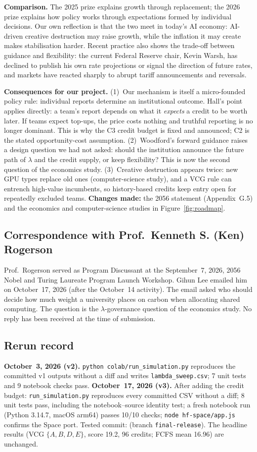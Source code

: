 \textbf{Comparison.} The 2025 prize explains growth through replacement; the 2026 prize explains how policy works through expectations formed by individual decisions. Our own reflection is that the two meet in today's AI economy: AI-driven creative destruction may raise growth, while the inflation it may create makes stabilisation harder. Recent practice also shows the trade-off between guidance and flexibility: the current Federal Reserve chair, Kevin Warsh, has declined to publish his own rate projections or signal the direction of future rates, and markets have reacted sharply to abrupt tariff announcements and reversals.

\textbf{Consequences for our project.} (1)~Our mechanism is itself a micro-founded policy rule: individual reports determine an institutional outcome. Hall's point applies directly: a team's report depends on what it \emph{expects} a credit to be worth later. If teams expect top-ups, the price costs nothing and truthful reporting is no longer dominant. This is why the C3 credit budget is fixed and announced; C2 is the stated opportunity-cost assumption. (2)~Woodford's forward guidance raises a design question we had not asked: should the institution announce the future path of $\lambda$ and the credit supply, or keep flexibility? This is now the second question of the economics study. (3)~Creative destruction appears twice: new GPU types replace old ones (computer-science study), and a VCG rule can entrench high-value incumbents, so history-based credits keep entry open for repeatedly excluded teams. \textbf{Changes made:} the 2056 statement (Appendix~G.5) and the economics and computer-science studies in Figure~\ref{fig:roadmap}.

\subsection{Correspondence with Prof.~Kenneth S. (Ken) Rogerson}
Prof.~Rogerson served as Program Discussant at the September~7, 2026, 2056 Nobel and Turing Laureate Program Launch Workshop. Gihun Lee emailed him on October~17, 2026 (after the October~14 activity). The email asked who should decide how much weight a university places on carbon when allocating shared computing. The question is the $\lambda$-governance question of the economics study. No reply has been received at the time of submission.

\subsection{Rerun record}
\textbf{October~3, 2026 (v2).} \texttt{python colab/run\_simulation.py} reproduces the committed v1 outputs without a diff and writes \texttt{lambda\_sweep.csv}; 7 unit tests and 9 notebook checks pass.
\textbf{October~17, 2026 (v3).} After adding the credit budget: \texttt{run\_simulation.py} reproduces every committed CSV without a diff; 8 unit tests pass, including the notebook--source identity test; a fresh notebook run (Python 3.14.7, macOS arm64) passes 10/10 checks; \texttt{node hf-space/app.js} confirms the Space port. Tested commit: \texttt{\TestedCommit} (branch \texttt{final-release}). The headline results (VCG $\{A,B,D,E\}$, score 19.2, 96 credits; FCFS mean 16.96) are unchanged.

